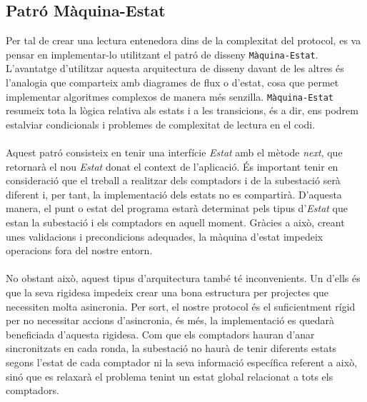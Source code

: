 \subsection{Patró Màquina-Estat}
Per tal de crear una lectura entenedora dins de la complexitat del protocol, es va pensar en implementar-lo utilitzant el patró de disseny \texttt{Màquina-Estat}. L'avantatge d'utilitzar aquesta arquitectura de disseny davant de les altres és l'analogia que comparteix amb diagrames de flux o d'estat, cosa que permet implementar algoritmes complexos de manera més senzilla. \texttt{Màquina-Estat} resumeix tota la lògica relativa als estats i a les transicions, és a dir, ens podrem estalviar condicionals i problemes de complexitat de lectura en el codi.
\\
\\
Aquest patró consisteix en tenir una interfície \textit{Estat} amb el mètode \textit{next}, que retornarà el nou \textit{Estat} donat el context de l'aplicació. És important tenir en consideració que el treball a realitzar dels comptadors i de la subestació serà diferent i, per tant, la implementació dels estats no es compartirà. D'aquesta manera, el punt o estat del programa estarà determinat pels tipus d'\textit{Estat} que estan la subestació i els comptadors en aquell moment. Gràcies a això, creant unes validacions i precondicions adequades, la màquina d’estat impedeix operacions fora del nostre entorn.
\\
\\
No obstant això, aquest tipus d'arquitectura també té inconvenients. Un d'ells és que la seva rigidesa impedeix crear una bona estructura per projectes que necessiten molta asincronia. Per sort, el nostre protocol és el suficientment rígid per no necessitar accions d'asincronia, és més, la implementació es quedarà beneficiada d'aquesta rigidesa. Com que els comptadors hauran d'anar sincronitzats en cada ronda, la subestació no haurà de tenir diferents estats segons l'estat de cada comptador ni la seva informació específica referent a això, sinó que es relaxarà el problema tenint un estat global relacionat a tots els comptadors.
